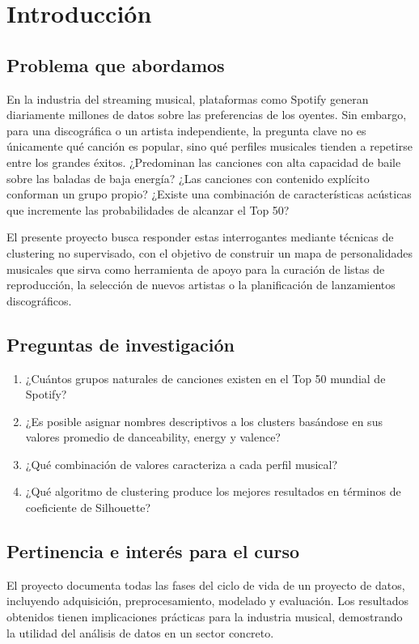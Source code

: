 \section{Introducción}

\subsection{Problema que abordamos}

En la industria del streaming musical, plataformas como Spotify generan diariamente millones de datos sobre las preferencias de los oyentes. Sin embargo, para una discográfica o un artista independiente, la pregunta clave no es únicamente qué canción es popular, sino qué perfiles musicales tienden a repetirse entre los grandes éxitos. ¿Predominan las canciones con alta capacidad de baile sobre las baladas de baja energía? ¿Las canciones con contenido explícito conforman un grupo propio? ¿Existe una combinación de características acústicas que incremente las probabilidades de alcanzar el Top 50?

El presente proyecto busca responder estas interrogantes mediante técnicas de clustering no supervisado, con el objetivo de construir un mapa de personalidades musicales que sirva como herramienta de apoyo para la curación de listas de reproducción, la selección de nuevos artistas o la planificación de lanzamientos discográficos.

\subsection{Preguntas de investigación}

\begin{enumerate}
    \item ¿Cuántos grupos naturales de canciones existen en el Top 50 mundial de Spotify?
    \item ¿Es posible asignar nombres descriptivos a los clusters basándose en sus valores promedio de danceability, energy y valence?
    \item ¿Qué combinación de valores caracteriza a cada perfil musical?
    \item ¿Qué algoritmo de clustering produce los mejores resultados en términos de coeficiente de Silhouette?
\end{enumerate}

\subsection{Pertinencia e interés para el curso}

El proyecto documenta todas las fases del ciclo de vida de un proyecto de datos, incluyendo adquisición, preprocesamiento, modelado y evaluación. Los resultados obtenidos tienen implicaciones prácticas para la industria musical, demostrando la utilidad del análisis de datos en un sector concreto.